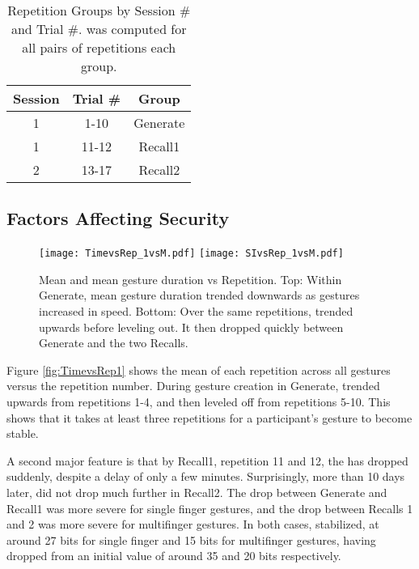 \documentclass{sig-alternate-10pt}
\begin{document}
\vspace{-5 pt}
\begin{table}[!h]
\begin{center}
\begin{tabular}{ccc}


Session & Trial \# & Group \\\hline 
     1 & 1-10 & Generate \\
     1 & 11-12 & Recall1 \\
     2 & 13-17 & Recall2 \\
\end{tabular}


\end{center}
\vspace{-15 pt}
\caption{Repetition Groups by Session \# and Trial \#.  was computed for all pairs of repetitions each group.}
\label{tab:RepetitionGroups}
\end{table}
\vspace{-7 pt}

\subsection{Factors Affecting Security}


 \begin{figure}[!h]
  \centering
    \texttt{[image: TimevsRep\_1vsM.pdf]}
    \texttt{[image: SIvsRep\_1vsM.pdf]}

  \caption{Mean   and mean gesture duration vs Repetition. Top: Within Generate, mean gesture duration trended downwards as gestures increased in speed. Bottom: Over the same repetitions,   trended upwards before leveling out. It then dropped quickly between Generate and the two Recalls. }
  \label{fig:TimevsRep1}
  \label{fig:SIvsRep1}

  \end{figure}

Figure \ref{fig:TimevsRep1} shows the mean  of each repetition across all gestures versus the repetition number. During gesture creation in Generate,  trended upwards from repetitions 1-4, and then leveled off from repetitions 5-10. This shows that it takes at least three repetitions for a participant's gesture to become stable.
  
A second major feature is that by Recall1, repetition 11 and 12, the  has dropped suddenly, despite a delay of only a few minutes. Surprisingly, more than 10 days later,  did not drop much further in Recall2. The drop between Generate and Recall1 was more severe for single finger gestures, and the drop between Recalls 1 and 2 was more severe for multifinger gestures. In both cases,  stabilized, at around 27 bits for single finger and 15 bits for multifinger gestures, having dropped from an initial value of around 35 and 20 bits respectively.
  
\end{document}
